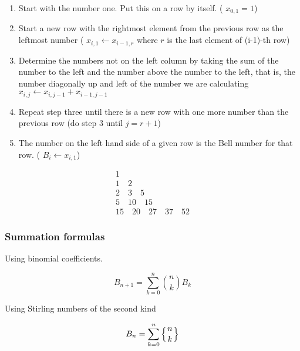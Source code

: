\begin{enumerate}
    \item Start with the number one. Put this on a row by itself. ( $x_{0,1}=1$)

    \item Start a new row with the rightmost element from the previous row as the leftmost number ( $x_{i,1} \leftarrow x_{i-1,r}$ where $r$ is the last element of (i-1)-th row)

    \item Determine the numbers not on the left column by taking the sum of the number to the left and the number above the number to the left, that is, the number diagonally up and left of the number we are calculating  $x_{i,j}\leftarrow x_{i,j-1}+x_{i-1,j-1}$

    \item Repeat step three until there is a new row with one more number than the previous row (do step 3 until $j=r+1$)

    \item The number on the left hand side of a given row is the Bell number for that row. ( $ B_{i} \leftarrow x_{i,1}$)
\end{enumerate}

\begin{equation}
\begin{array}{l}
        1                       \\
        1 \quad 2                     \\
        2 \quad 3 \quad 5                   \\
        5 \quad 10 \quad 15                    \\
        15 \quad 20 \quad 27 \quad 37 \quad 52
\end{array}
\end{equation}

\subsubsection{Summation formulas}

Using binomial coefficients.

\begin{equation} 
        B_{n+1}=\sum _{k=0}^{n}{\binom {n}{k}}B_{k}
        \label{Bell number using binomial coefficients}
\end{equation}

Using Stirling numbers of the second kind

\begin{equation}
        B_{n}=\sum _{k=0}^{n}\left\{{n \atop k}\right\}
        \label{Bell number using Stirling numbers of second kind}
\end{equation}

